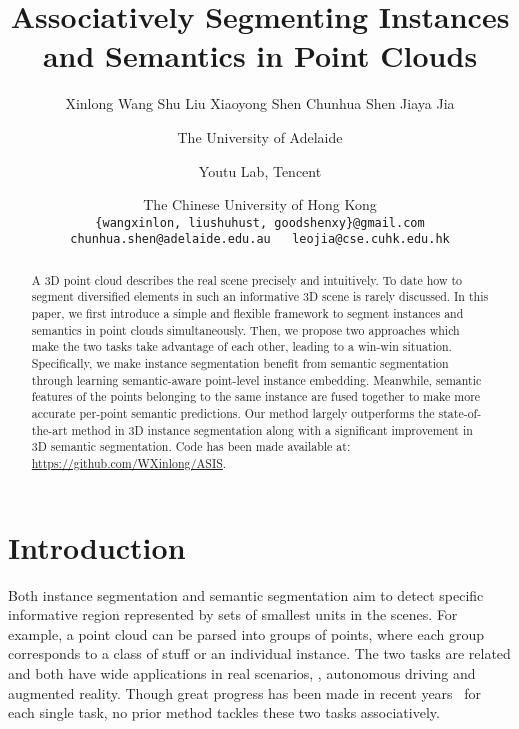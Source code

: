 \documentclass[10pt,twocolumn,letterpaper]{article}
\begin{document}
\title{Associatively Segmenting Instances and Semantics in Point Clouds}

\author{Xinlong Wang \quad Shu Liu \quad Xiaoyong Shen \quad Chunhua Shen \quad Jiaya Jia \\
\and 
The University of Adelaide\\
\and
Youtu Lab, Tencent\\
\and
The Chinese University of Hong Kong\\
{\tt\small  \{wangxinlon, liushuhust, goodshenxy\}@gmail.com}\\
{\tt\small chunhua.shen@adelaide.edu.au~~ leojia@cse.cuhk.edu.hk}\\
}

\maketitle


\begin{abstract}
  A 3D point cloud describes the real scene precisely and intuitively.
  To date how to segment diversified elements in such an informative 3D scene is rarely discussed. 
  In this paper, we first introduce a simple and flexible framework to segment instances and semantics in point clouds simultaneously.
  Then, we propose two approaches which make the two tasks take advantage of each other, leading to a win-win situation.
  Specifically, we make instance segmentation benefit from semantic segmentation through learning semantic-aware point-level instance embedding.
  Meanwhile, semantic features of the points belonging to the same instance are fused together to make more accurate per-point semantic predictions. 
  Our method largely outperforms the state-of-the-art method in 3D instance segmentation along with a significant improvement in 3D semantic segmentation.
  Code has been made available at: 
  \href{https://github.com/WXinlong/ASIS}{https://github.com/WXinlong/ASIS}.


\end{abstract}




\section{Introduction}

Both instance segmentation and semantic segmentation aim to detect specific informative region represented by sets of smallest units in the scenes.
For example, a point cloud can be parsed into groups of points, where each group corresponds to a class of stuff or an individual instance.
The two tasks are related and both have wide applications in real scenarios, \eg, autonomous driving and augmented reality.
Though great progress has been made in recent years~\cite{he2017mask,de2017semantic,long2015fully,tchapmi2017segcloud,Landrieu_2018_CVPR} for each single task, no prior method tackles these two tasks associatively.
\end{document}
